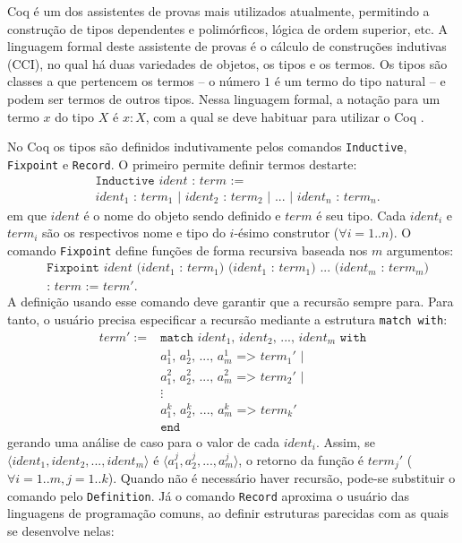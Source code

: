 Coq é um dos assistentes de provas mais utilizados atualmente, permitindo a construção de tipos dependentes e polimórficos, lógica de ordem superior, etc. A linguagem formal deste assistente de provas é o cálculo de construções indutivas (\acs{CCI}), no qual há duas variedades de objetos, os tipos e os termos. Os tipos são classes a que pertencem os termos -- o número $1$ é um termo do tipo natural -- e podem ser termos de outros tipos. Nessa linguagem formal, a notação para um termo $x$ do tipo $X$ é $x:X$, com a qual se deve habituar para utilizar o Coq \cite{manualcoq}.

No Coq os tipos são definidos indutivamente pelos comandos \texttt{Inductive}, \texttt{Fixpoint} e \texttt{Record}. O primeiro permite definir termos destarte: \begin{align*}
&\texttt{Inductive $ident$ : $term$ :=}\\ &\texttt{$ident_1$ : $term_1$ | $ident_2$ : $term_2$ | $...$ | $ident_n$ : $term_n$.}
\end{align*} em que $ident$ é o nome do objeto sendo definido e $term$ é seu tipo. Cada $ident_i$ e $term_i$ são os respectivos nome e tipo do $i$-ésimo construtor ($\forall i=1..n$). O comando \texttt{Fixpoint} define funções de forma recursiva baseada nos $m$ argumentos: \begin{align*}
&\texttt{Fixpoint $ident$ ($ident_1$ : $term_1$) ($ident_1$ : $term_1$) $...$ ($ident_m$ : $term_m$)}\\&\texttt{: $term$ := $term'$.}
\end{align*} A definição usando esse comando deve garantir que a recursão sempre para. Para tanto, o usuário precisa especificar a recursão mediante a estrutura \texttt{match with}: \begin{align*}
term' := \text{} & \texttt{match $ident_1$, $ident_2$, $...$, $ident_m$ with}\\
& \texttt{$a_1^1$, $a_2^1$, $...$, $a_m^1$ => $term_1'$ |}\\
& \texttt{$a_1^2$, $a_2^2$, $...$, $a_m^2$ => $term_2'$ |}\\
& \vdots\\
& \texttt{$a_1^k$, $a_2^k$, $...$, $a_m^k$ => $term_k'$}\\
& \texttt{end}
\end{align*} gerando uma análise de caso para o valor de cada $ident_i$. Assim, se $\langle ident_1, ident_2, \allowbreak ..., ident_m \rangle$ é $\langle a_1^j, a_2^j, ..., a_m^j \rangle$, o retorno da função é $term_j'$ ($\forall i = 1..m, j = 1..k$). Quando não é necessário haver recursão, pode-se substituir o comando pelo \texttt{Definition}. Já o comando \texttt{Record} aproxima o usuário das linguagens de programação comuns, ao definir estruturas parecidas com as quais se desenvolve nelas: \begin{align*}

\end{align*}
